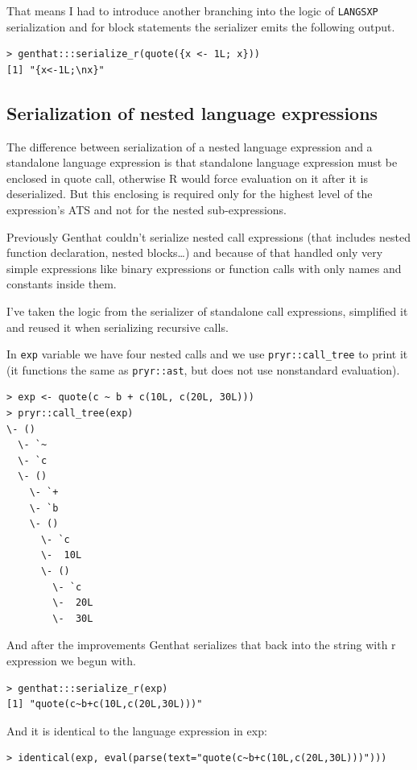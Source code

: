 \documentclass[thesis=B,english]{FITthesis}[2012/10/20]
\begin{document}
That means I had to introduce another branching into the logic of \verb|LANGSXP| serialization and for block statements the serializer emits the following output.

\begin{verbatim}
> genthat:::serialize_r(quote({x <- 1L; x}))
[1] "{x<-1L;\nx}"
\end{verbatim}

\subsection{Serialization of nested language expressions}
The difference between serialization of a nested language expression and a standalone language expression is that standalone language expression must be enclosed in quote call, otherwise R would force evaluation on it after it is deserialized. But this enclosing is required only for the highest level of the expression’s ATS and not for the nested sub-expressions. 

Previously Genthat couldn’t serialize nested call expressions (that includes nested function declaration, nested blocks…) and because of that handled only very simple expressions like binary expressions or function calls with only names and constants inside them.

I’ve taken the logic from the serializer of standalone call expressions, simplified it and reused it when serializing recursive calls.

In \verb|exp| variable we have four nested calls and we use \verb|pryr::call_tree| to print it (it functions the same as \verb|pryr::ast|, but does not use nonstandard evaluation).


\begin{verbatim}
> exp <- quote(c ~ b + c(10L, c(20L, 30L)))
> pryr::call_tree(exp)
\- ()
  \- `~
  \- `c
  \- ()
    \- `+
    \- `b
    \- ()
      \- `c
      \-  10L
      \- ()
        \- `c
        \-  20L
        \-  30L
\end{verbatim}

And after the improvements Genthat serializes that back into the string with r expression we begun with.

\begin{verbatim}
> genthat:::serialize_r(exp)
[1] "quote(c~b+c(10L,c(20L,30L)))"
\end{verbatim}

And it is identical to the language expression in exp:

\begin{verbatim}
> identical(exp, eval(parse(text="quote(c~b+c(10L,c(20L,30L)))")))
\end{verbatim}
\end{document}

